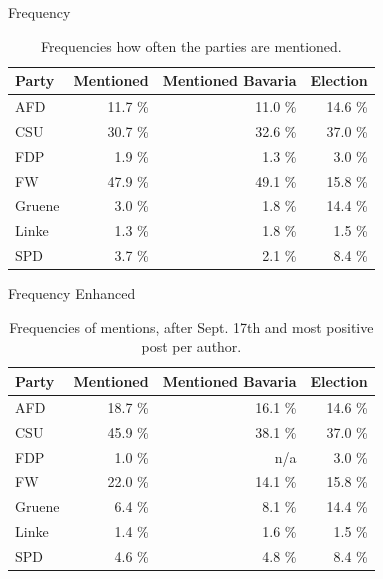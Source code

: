 
\begin{frame}{Frequency}
	\begin{table}
		\caption{Frequencies how often the parties are mentioned.}
		\begin{tabular}{l | r | r| r|}
			Party  & Mentioned & Mentioned Bavaria & Election \\ \hline\hline
			AFD    & 11.7 \%   & 11.0 \%           & 14.6 \%  \\
			CSU    & 30.7 \%   & 32.6 \%           & 37.0 \%  \\
			FDP    & 1.9 \%    & 1.3 \%            & 3.0 \%   \\
			FW     & 47.9 \%   & 49.1 \%           & 15.8 \%  \\
			Gruene & 3.0 \%    & 1.8 \%            & 14.4 \%  \\
			Linke  & 1.3 \%    & 1.8 \%            & 1.5 \%   \\
			SPD    & 3.7 \%    & 2.1 \%            & 8.4 \%
		\end{tabular}
	\end{table}
\end{frame}

\begin{frame}{Frequency Enhanced}
	\begin{table}
		\caption{Frequencies of mentions, after Sept. 17th and most positive post per author.}
		\begin{tabular}{l | r | r| r|}
			Party  & Mentioned & Mentioned Bavaria & Election \\ \hline\hline
			AFD    & 18.7 \%   & 16.1 \%           & 14.6 \%  \\
			CSU    & 45.9 \%   & 38.1 \%           & 37.0 \%  \\
			FDP    & 1.0 \%    & n/a            & 3.0 \%   \\
			FW     & 22.0 \%   & 14.1 \%           & 15.8 \%  \\
			Gruene & 6.4 \%    & 8.1 \%            & 14.4 \%  \\
			Linke  & 1.4 \%    & 1.6 \%            & 1.5 \%   \\
			SPD    & 4.6 \%    & 4.8 \%            & 8.4 \%
		\end{tabular}
	\end{table}
\end{frame}



